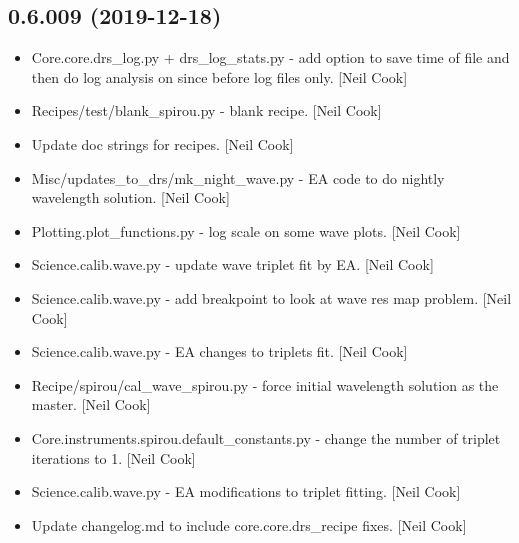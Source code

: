 \documentclass[a4paper,10pt,english]{report}
\begin{document}
\subsection{0.6.009 (2019-12-18)}
\label{\detokenize{misc/changelog:id8}}\begin{itemize}
\item {} 
Core.core.drs\_log.py + drs\_log\_stats.py - add option to save time of
file and then do log analysis on \textendash{}since \textendash{}before log files only.
{[}Neil Cook{]}

\item {} 
Recipes/test/blank\_spirou.py - blank recipe. {[}Neil Cook{]}

\item {} 
Update doc strings for recipes. {[}Neil Cook{]}

\item {} 
Misc/updates\_to\_drs/mk\_night\_wave.py - EA code to do nightly
wavelength solution. {[}Neil Cook{]}

\item {} 
Plotting.plot\_functions.py - log scale on some wave plots. {[}Neil Cook{]}

\item {} 
Science.calib.wave.py - update wave triplet fit by EA. {[}Neil Cook{]}

\item {} 
Science.calib.wave.py - add breakpoint to look at wave res map
problem. {[}Neil Cook{]}

\item {} 
Science.calib.wave.py - EA changes to triplets fit. {[}Neil Cook{]}

\item {} 
Recipe/spirou/cal\_wave\_spirou.py - force initial wavelength solution
as the master. {[}Neil Cook{]}

\item {} 
Core.instruments.spirou.default\_constants.py - change the number of
triplet iterations to 1. {[}Neil Cook{]}

\item {} 
Science.calib.wave.py - EA modifications to triplet fitting. {[}Neil
Cook{]}

\item {} 
Update changelog.md to include core.core.drs\_recipe fixes. {[}Neil Cook{]}

\end{itemize}
\end{document}
